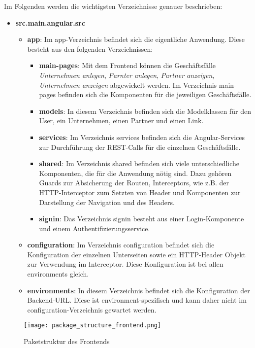 Im Folgenden werden die wichtigsten Verzeichnisse genauer beschrieben:
\begin{itemize}
	\item \textbf{src.main.angular.src}
	\begin{itemize}
		\item \textbf{app}: Im app-Verzeichnis befindet sich die eigentliche Anwendung. Diese besteht aus den folgenden Verzeichnissen:
		\begin{itemize}
			\item \textbf{main-pages}: Mit dem Frontend können die Geschäftsfälle \textit{Unternehmen anlegen}, \textit{Parnter anlegen}, \textit{Partner anzeigen}, \textit{Unternehmen anzeigen} abgewickelt werden. Im Verzeichnis main-pages befinden sich die Komponenten für die jeweiligen Geschäftsfälle.
			\item \textbf{models}: In diesem Verzeichnis befinden sich die Modelklassen für den User, ein Unternehmen, einen Partner und einen Link.
			\item \textbf{services}: Im Verzeichnis services befinden sich die Angular-Services zur Durchführung der REST-Calls für die einzelnen Geschäftsfälle.
			\item \textbf{shared}: Im Verzeichnis shared befinden sich viele unterschiedliche Komponenten, die für die Anwendung nötig sind. Dazu gehören Guards zur Absicherung der Routen, Interceptors, wie z.B. der HTTP-Interceptor zum Setzten von Header und Komponenten zur Darstellung der Navigation und des Headers.
 			\item \textbf{signin}: Das Verzeichnis signin besteht aus einer Login-Komponente und einem Authentifizierungsservice.
		\end{itemize}
		\item \textbf{configuration}: Im Verzeichnis configuration befindet sich die Konfiguration der einzelnen Unterseiten sowie ein HTTP-Header Objekt zur Verwendung im Interceptor. Diese Konfiguration ist bei allen environments gleich.
		\item \textbf{environments}: In diesem Verzeichnis befindet sich die Konfiguration der Backend-URL. Diese ist environment-spezifisch und kann daher nicht im configuration-Verzeichnis gewartet werden.
	\end{itemize}
\end{itemize}


\begin{figure}[H]
	\begin{center}
		\texttt{[image: package\_structure\_frontend.png]}
		\caption[Paketstruktur des Frontends]{Paketstruktur des Frontends}
		\label{fig:package_structure_frontend}
	\end{center}
\end{figure}

